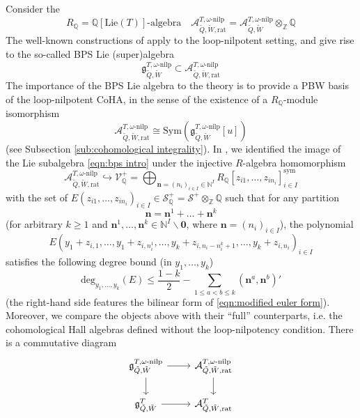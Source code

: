 \documentclass{amsart}
\def\BQ{{\mathbb{Q}}}
\def\BZ{{\mathbb{Z}}}
\def\CS{{\mathcal{S}}}
\def\CV{{\mathcal{V}}}
\def\sym{\textrm{sym}}
\def\nn{{\mathbb{N}^I}}
\def\bn{{\boldsymbol{n}}}
\def\b0{{\boldsymbol{0}}}
\def\tQ{\tilde{Q}}
\def\tW{\tilde{W}}
\def\ring{R}
\def\khrat{\mathcal{A}^{T}_{\tQ,\tW,\text{rat}}}
\def\kha{\mathcal{A}^{T,\omega\text{-nilp}}_{\tQ,\tW}}
\def\kharat{\mathcal{A}^{T,\omega\text{-nilp}}_{\tQ,\tW,\text{rat}}}
\def\tbpsw{\mathfrak{g}^{T,\omega\text{-nilp}}_{\tilde{Q},\tilde{W}}}
\def\tbps{\mathfrak{g}^T_{\tilde{Q},\tilde{W}}}
\begin{document}
Consider the
$$
\ring_{\BQ} = \BQ[\text{Lie}(T)]\text{-algebra} \quad \kharat = \kha \otimes_{\BZ} \BQ 
$$
The well-known constructions of \cite{davison2020cohomological, davison2022integrality} apply to the loop-nilpotent setting, and give rise to the so-called BPS Lie (super)algebra
\begin{equation}
\label{eqn:bps intro}
\tbpsw \subset \kharat
\end{equation}
The importance of the BPS Lie algebra to the theory is to provide a PBW basis of the loop-nilpotent CoHA, in the sense of the existence of a $\ring_{\BQ}$-module isomorphism
$$
\kharat \cong \text{Sym} \left(\tbpsw[u] \right) 
$$
(see Subsection \ref{sub:cohomological integrality}). In \cite{jindalnegutbps}, we identified the image of the Lie subalgebra \eqref{eqn:bps intro} under the injective $\ring$-algebra homomorphism
$$
\kharat \hookrightarrow \CV^+_{\BQ} = \bigoplus_{\bn = (n_i)_{i \in I} \in \nn} \ring_{\BQ}[z_{i1},\dots,z_{in_i}]^{\sym}_{i \in I}
$$
with the set of $E(z_{i1},\dots,z_{in_i})_{i \in I} \in \CS^+_{\BQ} = \CS^+ \otimes_{\BZ} \BQ$ such that for any partition
\begin{equation}
\label{eqn:intro partition}
\bn = \bn^1 + \dots + \bn^k
\end{equation}
(for arbitrary $k \geq 1$ and $\bn^1,\dots,\bn^k \in \nn \backslash \b0$, where $\bn = (n_i)_{i \in I}$), the polynomial
\begin{equation}
\label{eqn:intro add y}
E(y_1+z_{i,1},\dots,y_1+z_{i,n_i^1}, \dots,y_k+z_{i,n_i-n_i^k+1}, \dots, y_k+z_{i,n_i})_{i \in I}
\end{equation}
satisfies the following degree bound (in $y_1,\dots,y_k$)
\begin{equation}
\label{eqn:intro degree bound}
\text{deg}_{y_1,\dots,y_k}(E) \leq \frac {1-k}2 - \sum_{1\leq a < b \leq k} (\bn^a,\bn^b)'
\end{equation}
(the right-hand side features the bilinear form of \eqref{eqn:modified euler form}). Moreover, we compare the objects above with their ``full'' counterparts, i.e. the cohomological Hall algebras defined without the loop-nilpotency condition. There is a commutative diagram
 \begin{equation}
\label{eqn:commutative intro}
\begin{tikzcd}
\tbpsw	 & \kharat \\
\tbps & \khrat
    \arrow[from=1-1, to=1-2]
	\arrow[from=1-1, to=2-1]
	\arrow[from=1-2, to=2-2]
	\arrow[from=2-1, to=2-2]
\end{tikzcd}
\end{equation}
\end{document}
